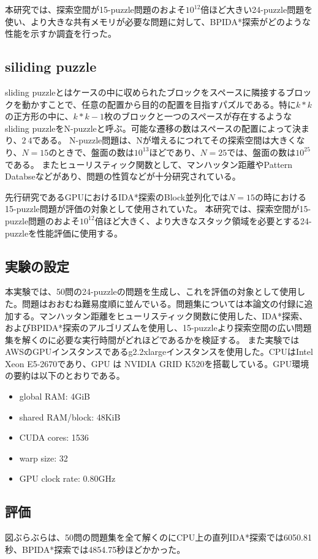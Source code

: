 \documentclass[a4paper,11pt,oneside,openany]{jsbook}
\begin{document}
本研究では、探索空間が15-puzzle問題のおよそ$10^12$倍ほど大きい24-puzzle問題を使い、より大きな共有メモリが必要な問題に対して、BPIDA*探索がどのような性能を示すか調査を行った。


\subsection{siliding puzzle}
sliding puzzleとはケースの中に収められたブロックをスペースに隣接するブロックを動かすことで、任意の配置から目的の配置を目指すパズルである。特に$k * k$の正方形の中に、$ k * k - 1$枚のブロックと一つのスペースが存在するようなsliding puzzleをN-puzzleと呼ぶ。可能な遷移の数はスペースの配置によって決まり、$2~4$である。
N-puzzle問題は、Nが増えるにつれてその探索空間は大きくなり、$N=15$のときで、盤面の数は$10^13$ほどであり、$N=25$では、盤面の数は$10^25$である。
またヒューリスティック関数として、マンハッタン距離やPattern Databseなどがあり、問題の性質などが十分研究されている。

先行研究であるGPUにおけるIDA*探索のBlock並列化\cite{HA17}では$N=15$の時における15-puzzle問題が評価の対象として使用されていた。
本研究では、探索空間が15-puzzle問題のおよそ$10^12$倍ほど大きく、より大きなスタック領域を必要とする24-puzzleを性能評価に使用する。


\subsection{実験の設定}
本実験では、50問の24-puzzleの問題を生成し、これを評価の対象として使用した。問題はおおむね難易度順に並んでいる。問題集については本論文の付録に追加する。マンハッタン距離をヒューリスティック関数に使用した、IDA*探索、およびBPIDA*探索\cite{HA17}のアルゴリズムを使用し、15-puzzleより探索空間の広い問題集を解くのに必要な実行時間がどれほどであるかを検証する。
また実験ではAWSのGPUインスタンスであるg2.2xlargeインスタンスを使用した。CPUはIntel Xeon E5-2670であり、GPU
は NVIDIA GRID K520を搭載している。GPU環境の要約は以下のとおりである。
\begin{itemize}
 \item global RAM: 4GiB
 \item shared RAM/block: 48KiB
 \item CUDA cores: 1536
 \item warp size: 32
 \item GPU clock rate: 0.80GHz
\end{itemize}

\subsection{評価}
図ぶらぶらは、50問の問題集を全て解くのにCPU上の直列IDA*探索では6050.81秒、BPIDA*探索では4854.75秒ほどかかった。
\end{document}
